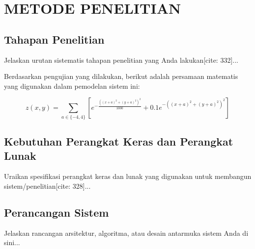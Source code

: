 \chapter{METODE PENELITIAN}


\section{Tahapan Penelitian}
Jelaskan urutan sistematis tahapan penelitian yang Anda lakukan[cite: 332]...

Berdasarkan pengujian yang dilakukan, berikut adalah persamaan matematis yang digunakan dalam pemodelan sistem ini:

\begin{equation}
	z(x,y) = \sum_{a \in \{-4,4\}} \left[ e^{-\frac{((x+a)^2+(y+a)^2)^2}{1000}} + 0.1e^{-((x+a)^2+(y+a)^2)^2} \right]
\end{equation}

\section{Kebutuhan Perangkat Keras dan Perangkat Lunak}
Uraikan spesifikasi perangkat keras dan lunak yang digunakan untuk membangun sistem/penelitian[cite: 328]...

\section{Perancangan Sistem}
Jelaskan rancangan arsitektur, algoritma, atau desain antarmuka sistem Anda di sini...